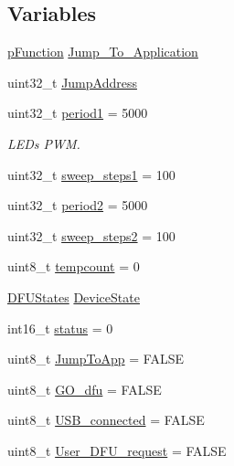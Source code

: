 \subsection*{\-Variables}
\begin{DoxyCompactItemize}
\item 
\hyperlink{group___sparky_b_l_ga9227bf1f1a9c633a0cc9ca50cc761c1a}{p\-Function} \hyperlink{group___pip_xtreme_b_l_gafe6990204003a7b416139a4723064b14}{\-Jump\-\_\-\-To\-\_\-\-Application}
\item 
uint32\-\_\-t \hyperlink{group___pip_xtreme_b_l_ga77170d6dd28c130d54753378bdfa035e}{\-Jump\-Address}
\item 
uint32\-\_\-t \hyperlink{group___pip_xtreme_b_l_gabe751b3d399e053031c1e3db20b6b071}{period1} = 5000
\begin{DoxyCompactList}\small\item\em \-L\-E\-Ds \-P\-W\-M. \end{DoxyCompactList}\item 
uint32\-\_\-t \hyperlink{group___pip_xtreme_b_l_ga594b91aa3e135c58969dc298b8acdeb3}{sweep\-\_\-steps1} = 100
\item 
uint32\-\_\-t \hyperlink{group___pip_xtreme_b_l_gadf8633b43922fbf4f1d86981daf74ccc}{period2} = 5000
\item 
uint32\-\_\-t \hyperlink{group___pip_xtreme_b_l_gac9cf28c40cee906b9405cb32f16b1fa2}{sweep\-\_\-steps2} = 100
\item 
uint8\-\_\-t \hyperlink{group___pip_xtreme_b_l_ga61692259c50bf6def0bc56b1c2fd44b8}{tempcount} = 0
\item 
\hyperlink{group___copter_control_b_l_ga9a9e510f2da4e725074c7191d9d75d37}{\-D\-F\-U\-States} \hyperlink{group___pip_xtreme_b_l_ga342208ed1954c6486eac389edf7c7f86}{\-Device\-State}
\item 
int16\-\_\-t \hyperlink{group___pip_xtreme_b_l_ga2414697de79a243562514a0a4344a4dd}{status} = 0
\item 
uint8\-\_\-t \hyperlink{group___pip_xtreme_b_l_ga6c435d21e1e77b6e71943e6ecac43154}{\-Jump\-To\-App} = \-F\-A\-L\-S\-E
\item 
uint8\-\_\-t \hyperlink{group___pip_xtreme_b_l_ga45c9bb4b375b5f606e1ef13138fd01ae}{\-G\-O\-\_\-dfu} = \-F\-A\-L\-S\-E
\item 
uint8\-\_\-t \hyperlink{group___pip_xtreme_b_l_gac2fd478a40cb67cd7b769eb34ed0a063}{\-U\-S\-B\-\_\-connected} = \-F\-A\-L\-S\-E
\item 
uint8\-\_\-t \hyperlink{group___pip_xtreme_b_l_ga4e35257eb1d649bd7353cb4a4d37d5fb}{\-User\-\_\-\-D\-F\-U\-\_\-request} = \-F\-A\-L\-S\-E

\end{DoxyCompactItemize}
